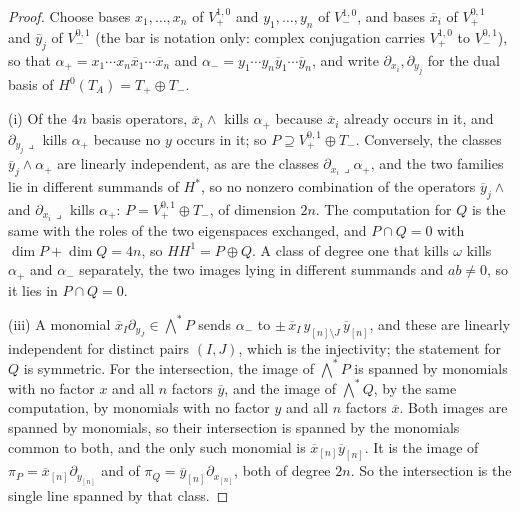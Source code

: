 \documentclass[11pt,reqno]{amsart}
\theoremstyle{plain}
\theoremstyle{definition}
\theoremstyle{remark}
\newcommand{\bbar}[1]{\overline{#1}}
\begin{document}
\begin{proof}
Choose bases $x_{1},\dots,x_{n}$ of $V_{+}^{1,0}$ and $y_{1},\dots,y_{n}$ of
$V_{-}^{1,0}$, and bases $\bbar x_{i}$ of $V_{+}^{0,1}$ and $\bbar y_{j}$ of
$V_{-}^{0,1}$ (the bar is notation only: complex conjugation carries
$V_{+}^{1,0}$ to $V_{-}^{0,1}$), so that
$\alpha_{+}=x_{1}\cdots x_{n}\bbar x_{1}\cdots\bbar x_{n}$ and
$\alpha_{-}=y_{1}\cdots y_{n}\bbar y_{1}\cdots\bbar y_{n}$, and write
$\partial_{x_{i}},\partial_{y_{j}}$ for the dual basis of
$H^{0}(T_{A})=T_{+}\oplus T_{-}$.

(i) Of the $4n$ basis operators, $\bbar x_{i}\wedge$ kills $\alpha_{+}$
because $\bbar x_{i}$ already occurs in it, and $\partial_{y_{j}}\lrcorner$
kills $\alpha_{+}$ because no $y$ occurs in it; so $P\supseteq
V_{+}^{0,1}\oplus T_{-}$. Conversely, the classes
$\bbar y_{j}\wedge\alpha_{+}$ are linearly independent, as are the classes
$\partial_{x_{i}}\lrcorner\alpha_{+}$, and the two families lie in different
summands of $H^{*}$, so no nonzero combination of the operators
$\bbar y_{j}\wedge$ and $\partial_{x_{i}}\lrcorner$ kills $\alpha_{+}$:
$P=V_{+}^{0,1}\oplus T_{-}$, of dimension $2n$. The computation for $Q$ is the
same with the roles of the two eigenspaces exchanged, and
$P\cap Q=0$ with $\dim P+\dim Q=4n$, so $HH^{1}=P\oplus Q$. A class of degree
one that kills $\omega$ kills $\alpha_{+}$ and $\alpha_{-}$ separately, the
two images lying in different summands and $ab\ne0$, so it lies in
$P\cap Q=0$.

(iii) A monomial $\bbar x_{I}\partial_{y_{J}}\in\bigwedge^{*}P$ sends
$\alpha_{-}$ to $\pm\,\bbar x_{I}\,y_{[n]\setminus J}\,\bbar y_{[n]}$, and
these are linearly independent for distinct pairs $(I,J)$, which is the
injectivity; the statement for $Q$ is symmetric. For the intersection, the
image of $\bigwedge^{*}P$ is spanned by monomials with no factor $x$ and all
$n$ factors $\bbar y$, and the image of $\bigwedge^{*}Q$, by the same
computation, by monomials with no factor $y$ and all $n$ factors $\bbar x$.
Both images are spanned by monomials, so their intersection is spanned by the
monomials common to both, and the only such monomial is
$\bbar x_{[n]}\bbar y_{[n]}$. It is the image of
$\pi_{P}=\bbar x_{[n]}\partial_{y_{[n]}}$ and of
$\pi_{Q}=\bbar y_{[n]}\partial_{x_{[n]}}$, both of degree $2n$. So the
intersection is the single line spanned by that class.


\end{proof}
\end{document}

